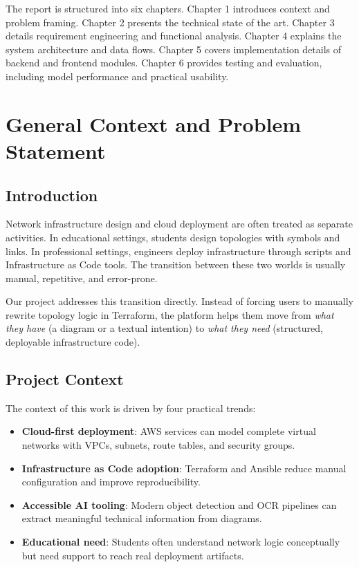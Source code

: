 \documentclass[12pt,a4paper,openany]{report}
\begin{document}
The report is structured into six chapters. Chapter 1 introduces context and problem framing. Chapter 2 presents the technical state of the art. Chapter 3 details requirement engineering and functional analysis. Chapter 4 explains the system architecture and data flows. Chapter 5 covers implementation details of backend and frontend modules. Chapter 6 provides testing and evaluation, including model performance and practical usability.

\chapter{General Context and Problem Statement}

\section{Introduction}

Network infrastructure design and cloud deployment are often treated as separate activities. In educational settings, students design topologies with symbols and links. In professional settings, engineers deploy infrastructure through scripts and Infrastructure as Code tools. The transition between these two worlds is usually manual, repetitive, and error-prone.

Our project addresses this transition directly. Instead of forcing users to manually rewrite topology logic in Terraform, the platform helps them move from \textit{what they have} (a diagram or a textual intention) to \textit{what they need} (structured, deployable infrastructure code).

\section{Project Context}

The context of this work is driven by four practical trends:
\begin{itemize}
    \item \textbf{Cloud-first deployment}: AWS services can model complete virtual networks with VPCs, subnets, route tables, and security groups.
    \item \textbf{Infrastructure as Code adoption}: Terraform and Ansible reduce manual configuration and improve reproducibility.
    \item \textbf{Accessible AI tooling}: Modern object detection and OCR pipelines can extract meaningful technical information from diagrams.
    \item \textbf{Educational need}: Students often understand network logic conceptually but need support to reach real deployment artifacts.
\end{itemize}
\end{document}

